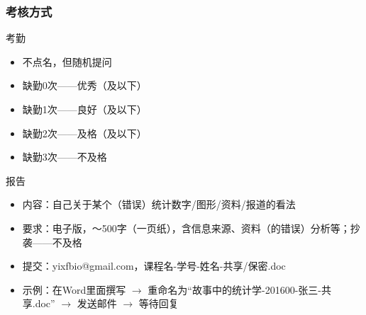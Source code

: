\begin{frame}
  \frametitle{\alert{考核方式}}
  \begin{block}{考勤}
    \begin{itemize}
      \item 不点名，但随机提问
      \item 缺勤0次——优秀（及以下）
      \item 缺勤1次——良好（及以下）
      \item 缺勤2次——及格（及以下）
      \item 缺勤3次——不及格
    \end{itemize}
  \end{block}
  \pause
  \begin{block}{报告}
    \begin{itemize}
      \item 内容：自己关于某个（错误）统计数字/图形/资料/报道的看法
      \item 要求：电子版，～500字（一页纸），含信息来源、资料（的错误）分析等；抄袭——不及格
      \item 提交：yixfbio@gmail.com，课程名-学号-姓名-共享/保密.doc
      \item 示例：在Word里面撰写 $\rightarrow$ 重命名为“故事中的统计学-201600-张三-共享.doc” $\rightarrow$ 发送邮件 $\rightarrow$ 等待回复
    \end{itemize}
  \end{block}
\end{frame}

